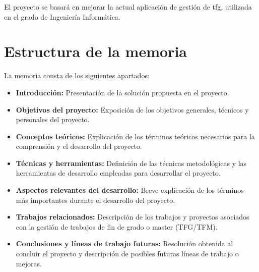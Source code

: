 El proyecto se basará en mejorar la actual aplicación de gestión de tfg, utilizada en el grado de Ingeniería Informática.

\section{Estructura de la memoria}
La memoria consta de los siguientes apartados:

\begin{itemize}
	\item \textbf{Introducción:} Presentación de la solución propuesta en el proyecto. 
	\item \textbf{Objetivos del proyecto:}  Exposición de los    objetivos generales, técnicos y personales del proyecto.
	\item \textbf{Conceptos teóricos:} Explicación de los términos teóricos necesarios para la comprensión y el desarrollo del proyecto.
	\item \textbf{Técnicas y herramientas:} Definición de las técnicas metodológicas y las herramientas de desarrollo empleadas para desarrollar el proyecto.
	\item \textbf{Aspectos relevantes del desarrollo:} Breve explicación de los términos más importantes durante el desarrollo del proyecto.
	\item \textbf{Trabajos relacionados:} Descripción de los trabajos y proyectos asociados con la gestión de trabajos de fin de grado o master (TFG/TFM).
	\item \textbf{Conclusiones y líneas de trabajo futuras:} Resolución obtenida al concluir el proyecto y descripción de posibles futuras líneas de trabajo o mejoras.
\end{itemize}